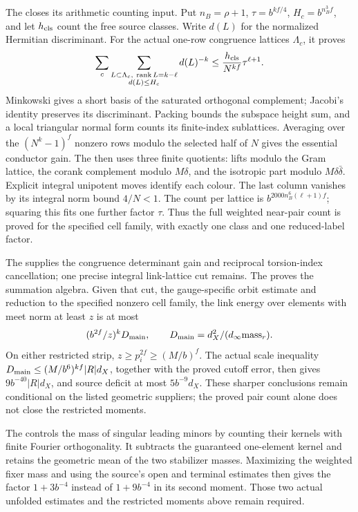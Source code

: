 The  closes its arithmetic counting input. Put
\(n_B=\rho+1\), \(\tau=b^{kf/4}\), \(H_c=b^{n_B^3f}\), and let
\(h_{\rm cls}\) count the free source classes. Write \(d(L)\) for
the normalized Hermitian discriminant. For the actual one-row
congruence lattices \(\Lambda_c\), it proves
\[
 \sum_c\sum_{\substack{L\subset\Lambda_c,\ \operatorname{rank}L=k-\ell\\
                       d(L)\le H_c}}d(L)^{-k}
 \le\frac{h_{\rm cls}}{N^{kf}}\tau^{\ell+1}.
\]
Minkowski gives a short basis of the saturated orthogonal complement;
Jacobi's identity preserves its discriminant. Packing bounds the
subspace height sum, and a local triangular normal form counts its
finite-index sublattices. Averaging over the \((N^k-1)^f\) nonzero
rows modulo the selected half of \(N\) gives the essential conductor
gain. The  then uses three finite quotients: lifts modulo the Gram
lattice, the corank complement modulo \(M\delta\), and the isotropic
part modulo \(M\delta\bar\delta\). Explicit integral unipotent moves
identify each colour. The last column vanishes by its integral norm
bound \(4/N<1\). The count per lattice is
\(b^{2000n_B^6(\ell+1)f}\); squaring this fits one further factor
\(\tau\). Thus the full weighted near-pair count is proved for the
specified cell family, with exactly one class and one reduced-label
factor.

The 
supplies the congruence determinant gain and reciprocal torsion-index
cancellation; one precise integral link-lattice cut remains.
The  proves the summation algebra. Given that cut,
the gauge-specific orbit estimate and reduction to
the specified nonzero cell family, the link energy over elements
with meet norm at least \(z\) is at most
\[
 (b^{2f}/z)^kD_{\rm main},\qquad
 D_{\rm main}=d_X^2/(d_\infty\mathrm{mass}_r).
\]
On either restricted strip, \(z\ge p_i^{2f}\ge(M/b)^f\).
The actual scale inequality
\(D_{\rm main}\le(M/b^6)^{kf}|R|d_X\), together with the proved
cutoff error, then gives \(9b^{-40}|R|d_X\), and source deficit
at most \(5b^{-9}d_X\). These sharper conclusions remain conditional
on the listed geometric suppliers; the proved pair count alone
does not close the restricted moments.

The  controls the mass of singular leading minors by
counting their kernels with finite Fourier orthogonality.
It subtracts the guaranteed one-element kernel and retains the
geometric mean of the two stabilizer masses. Maximizing the weighted
fixer mass and using the source's open and terminal estimates then
gives the factor \(1+3b^{-4}\) instead of \(1+9b^{-4}\)
in its second moment. Those two actual unfolded estimates and the
restricted moments above remain required.

